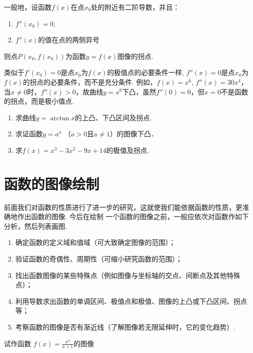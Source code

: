 一般地，设函数$f(x)$在点$x_0$处的附近有二阶导数，并且：
\begin{enumerate}[(1)]
\item $f''(x_0)=0$;
\item $f''(x)$的值在点的两侧异号
\end{enumerate}
则点$P(x_0,f(x_0))$为函数$y=f(x)$图像的拐点.

类似于$f'(x_0)=0$是点$x_0$为$f(x)$的极值点的必要条件一样, $f''(x)=0$是点$x_0$为$f(x)$的拐点的必要条件，而不是充分条件. 例如，$f(x)=x^6$, $f''(x)=30x^4$，当$x\ne 0$时，$f''(x)>0$，故曲线$y=x^6$下凸，虽然$f''(0)=0$，但$x=0$不是函数的拐点，而是极小值点.

\begin{ex}
\begin{enumerate}
    \item 求曲线$y=\arctan x$的上凸、下凸区间及拐点.
    \item 求证函数$y=a^x$ （$a>0$且$a\ne 1$）的图像下凸．
    \item 求$f(x)=x^3-3x^2-9x+14$的极值及拐点.
\end{enumerate}
\end{ex}

\section{函数的图像绘制}
前面我们对函数的性质进行了进一步的研究，这就使我们能依据函数的性质，更准确地作出函数的图像. 今后在绘制
一个函数的图像之前，一般应依次对函数作如下分析，然后列表画图.
\begin{enumerate}
\item 确定函数的定义域和值域（可大致确定图像的范围）；
\item 验证函数的奇偶性、周期性（可缩小研究函数的范围）；
\item 找出函数图像的某些特殊点（例如图像与坐标轴的交点、间断点及其他特殊点）；
\item 利用导数求出函数的单调区间、极值点和极值、图像的上凸或下凸区间、拐点等；
\item 考察函数的图像是否有渐近线（了解图像若无限延伸时，它的变化趋势）.
\end{enumerate}





\begin{example}
    试作函数 $f(x)=\frac{x^{2}}{x+1}$的图像
\end{example}

